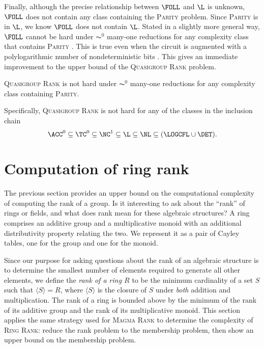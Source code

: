 \documentclass{article}
\newcommand{\gen}[1]{\langle #1 \rangle}
\begin{document}
Finally, although the precise relationship between $\FOLL$ and $\L$ is unknown, $\FOLL$ does not contain any class containing the \textsc{Parity} problem.
Since \textsc{Parity} is in $\L$, we know $\FOLL$ does not contain $\L$.
Stated in a slightly more general way, $\FOLL$ cannot be hard under $\AC^0$ many-one reductions for any complexity class that contains \textsc{Parity} \cite[Proposition~2.1]{bklm01}.
This is true even when the circuit is augmented with a polylogarithmic number of nondeterministic bits \cite[Section~4]{ctw13}.
This gives an immediate improvement to the upper bound of the \textsc{Quasigroup Rank} problem.

\begin{theorem}
  \textsc{Quasigroup Rank} is not hard under $\AC^0$ many-one reductions for any complexity class containing \textsc{Parity}.
\end{theorem}

Specifically, \textsc{Quasigroup Rank} is not hard for any of the classes in the inclusion chain
\begin{equation*}
  \ACC^0 \subseteq \TC^0 \subseteq \NC^1 \subseteq \L \subseteq \NL \subseteq (\LOGCFL \cup \DET).
\end{equation*}

\section{Computation of ring rank}
%
The previous section provides an upper bound on the computational complexity of computing the rank of a group.
Is it interesting to ask about the ``rank'' of rings or fields, and what does rank mean for these algebraic structures?
A ring comprises an additive group and a multiplicative monoid with an additional distributivity property relating the two.
We represent it as a pair of Cayley tables, one for the group and one for the monoid.

Since our purpose for asking questions about the rank of an algebraic structure is to determine the smallest number of elements required to generate all other elements, we define the \emph{rank of a ring $R$} to be the minimum cardinality of a set $S$ such that $\gen{S} = R$, where $\gen{S}$ is the closure of $S$ under \emph{both} addition and multiplication.
The rank of a ring is bounded above by the minimum of the rank of its additive group and the rank of its multiplicative monoid.  %
This section applies the same strategy used for \textsc{Magma Rank} to determine the complexity of \textsc{Ring Rank}: reduce the rank problem to the membership problem, then show an upper bound on the membership problem.
\end{document}
